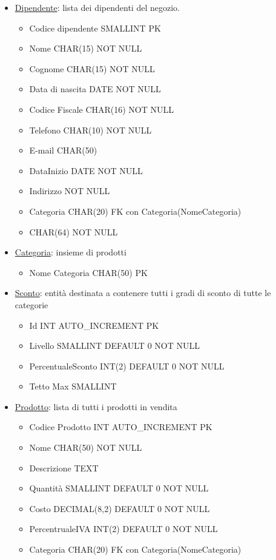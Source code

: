 \begin{itemize}

\item \underline{Dipendente}: lista dei dipendenti del negozio.
  
  \begin{itemize}

  \item Codice dipendente SMALLINT PK
  \item Nome CHAR(15) NOT NULL
  \item Cognome CHAR(15) NOT NULL
  \item Data di nascita DATE NOT NULL
  \item Codice Fiscale CHAR(16) NOT NULL
  \item Telefono CHAR(10) NOT NULL
  \item E-mail CHAR(50)
  \item DataInizio DATE NOT NULL
  \item Indirizzo NOT NULL
  \item Categoria CHAR(20) FK con Categoria(NomeCategoria)
  \item CHAR(64) NOT NULL

  \end{itemize}

\item \underline{Categoria}: insieme di prodotti
  \begin{itemize}
  \item Nome Categoria CHAR(50) PK
  \end{itemize}

\item \underline{Sconto}: entit\`a destinata a contenere tutti i gradi di sconto di tutte le categorie
  \begin{itemize}
    \item Id INT AUTO\_INCREMENT PK
  \item Livello SMALLINT DEFAULT 0 NOT NULL
  \item PercentualeSconto INT(2) DEFAULT 0 NOT NULL
  \item Tetto Max SMALLINT
  \end{itemize}

\item \underline{Prodotto}: lista di tutti i prodotti in vendita
  \begin{itemize}
  \item Codice Prodotto INT AUTO\_INCREMENT PK
  \item Nome CHAR(50) NOT NULL
  \item Descrizione TEXT
  \item Quantit\`a SMALLINT DEFAULT 0 NOT NULL
  \item Costo DECIMAL(8,2) DEFAULT 0 NOT NULL
  \item PercentrualeIVA INT(2) DEFAULT 0 NOT NULL
  \item Categoria CHAR(20) FK con Categoria(NomeCategoria)
  \end{itemize}


\end{itemize}
